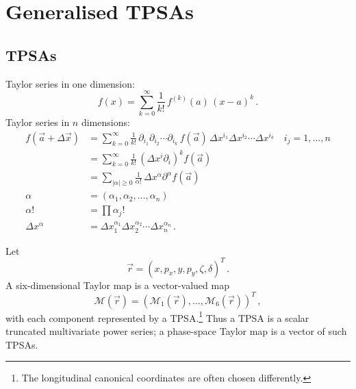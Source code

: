 

\chapter{Generalised TPSAs}



\section{TPSAs}

Taylor series in one dimension:
\begin{equation}
    f(x) = \sum\limits_{k = 0}^\infty \frac{1}{k!} \, f^{(k)}(a)\,(x-a)^k\,.
\end{equation}
Taylor series in $n$ dimensions:
\begin{align*}
    f(\vec a + \Delta\vec x) & = \sum\limits_{k = 0}^\infty \frac{1}{k!} \,
    \partial_{i_1}\partial_{i_2}\cdots\partial_{i_k}\,f(\vec a)\,
    \Delta x^{i_1}\Delta x^{i_2}\cdots \Delta x^{i_k}
    \quad i_j = 1, \ldots, n\\
    & = \sum\limits_{k = 0}^\infty \frac{1}{k!} \,
    \left(\Delta x^i \partial_i\right)^{\!k} f(\vec a) \\
    & = \sum\limits_{|\alpha|\geq 0} \frac{1}{\alpha!} \,
    \Delta x^\alpha \partial^\alpha f(\vec a) \\
    \alpha & = (\alpha_1, \alpha_2, \ldots, \alpha_n) \\
    \alpha! & = \prod \alpha_j! \\
    \Delta x^\alpha & = \Delta x_1^{\alpha_1}\Delta x_2^{\alpha_2}\cdots \Delta x_n^{\alpha_n}\,.
\end{align*}

Let
\begin{equation}
    \vec r = (x,p_x,y,p_y,\zeta,\delta)^T\,.
\end{equation}
A six-dimensional Taylor map is a vector-valued map
\begin{equation}
    \mathcal M(\vec r)
    = (\mathcal M_1(\vec r),\ldots,\mathcal M_6(\vec r))^T\,,
\end{equation}
with each component represented by a TPSA.\footnote{The longitudinal canonical
coordinates are often chosen differently.}  Thus a TPSA is a scalar truncated
multivariate power series; a phase-space Taylor map is a vector of such TPSAs.


